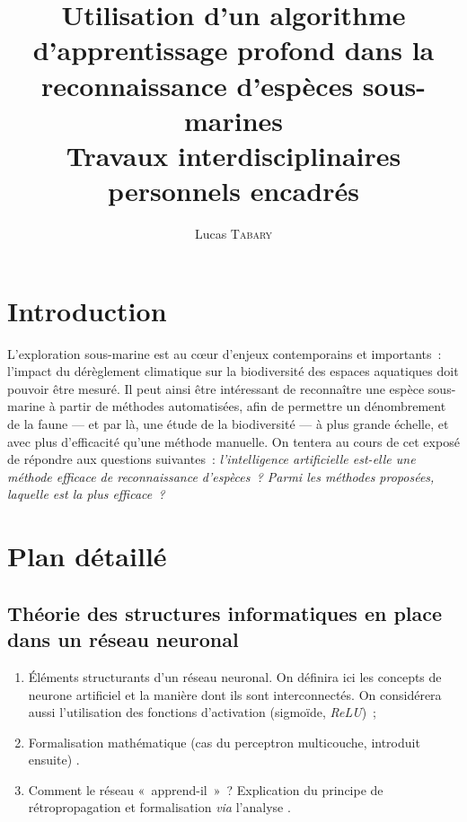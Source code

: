 \documentclass{article}
\title{Utilisation d'un algorithme d'apprentissage profond dans la reconnaissance d'espèces sous-marines \\ \normalsize Travaux interdisciplinaires personnels encadrés}
\author{Lucas \textsc{Tabary}}
\date{}
\begin{document}
\maketitle
\thispagestyle{fancy}
\cfoot{}

\section{Introduction}
  L'exploration sous-marine est au cœur d'enjeux contemporains et importants~: l'impact du dérèglement climatique sur la biodiversité des espaces aquatiques doit pouvoir être mesuré. Il peut ainsi être intéressant de reconnaître une espèce sous-marine à partir de méthodes automatisées, afin de permettre un dénombrement de la faune --- et par là, une étude de la biodiversité --- à plus grande échelle, et avec plus d'efficacité qu'une méthode manuelle. On tentera au cours de cet exposé de répondre aux questions suivantes~: \textit{l'intelligence artificielle est-elle une méthode efficace de reconnaissance d'espèces~? Parmi les méthodes proposées, laquelle est la plus efficace~?}

\section{Plan détaillé}
  \subsection{Théorie des structures informatiques en place dans un réseau neuronal}
    \begin{enumerate}
      \item Éléments structurants d'un réseau neuronal. On définira ici les concepts de neurone artificiel et la manière dont ils sont interconnectés. On considérera aussi l'utilisation des fonctions d'activation (sigmoïde, \textit{ReLU})~;
      \item Formalisation mathématique (cas du perceptron multicouche, introduit ensuite) \cite{3B1B:2018}.
      \item Comment le réseau «~apprend-il~»~? Explication du principe de rétropropagation et formalisation \textit{via} l'analyse \cite{Rojas:1996}.
    \end{enumerate}
\end{document}
